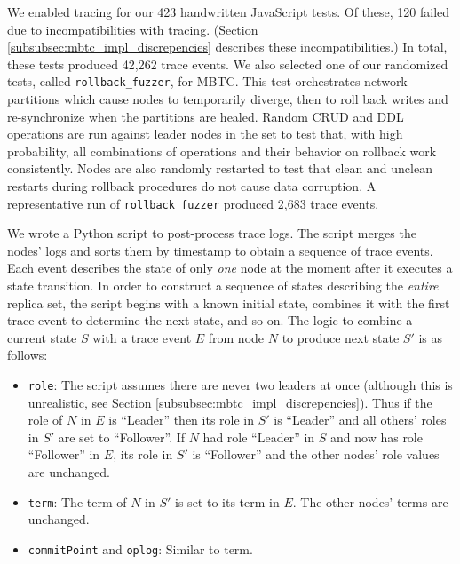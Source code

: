 \documentclass{vldb}
\begin{document}
We enabled tracing for our 423 handwritten JavaScript tests. 
Of these, 120 failed due to incompatibilities with tracing. 
(Section \ref{subsubsec:mbtc_impl_discrepencies} describes these incompatibilities.)
In total, these tests produced 42,262 trace events. 
We also selected one of our randomized tests, called \texttt{rollback\_fuzzer}, for MBTC. 
This test orchestrates network partitions which cause nodes to temporarily diverge, then to roll back writes and re-synchronize when the partitions are healed.
Random CRUD and DDL operations are run against leader nodes in the set to test that, with high probability, all combinations of operations and their behavior on rollback work consistently.
Nodes are also randomly restarted to test that clean and unclean restarts during rollback procedures do not cause data corruption.
A representative run of \texttt{rollback\_fuzzer} produced 2,683 trace events.

We wrote a Python script \cite{ReplTraceChecker} to post-process trace logs. 
The script merges the nodes' logs and sorts them by timestamp to obtain a sequence of trace events. 
Each event describes the state of only \textit{one} node at the moment after it executes a state transition.
In order to construct a sequence of states describing the \textit{entire} replica set, the script begins with a known initial state, combines it with the first trace event to determine the next state, and so on. 
The logic to combine a current state $S$ with a trace event $E$ from node $N$ to produce next state $S'$ is as follows:

\begin{itemize}[itemsep=-0.5ex]
\item \texttt{role}: The script assumes there are never two leaders at once (although this is unrealistic, see Section \ref{subsubsec:mbtc_impl_discrepencies}). Thus if the role of $N$ in $E$ is ``Leader'' then its role in $S'$ is ``Leader'' and all others' roles in $S'$ are set to ``Follower''. If $N$ had role ``Leader'' in $S$ and now has role ``Follower'' in $E$, its role in $S'$ is ``Follower'' and the other nodes' role values are unchanged. 
\item \texttt{term}: The term of $N$ in $S'$ is set to its term in $E$. The other nodes' terms are unchanged.
\item \texttt{commitPoint} and \texttt{oplog}: Similar to term.
\end{itemize}
\end{document}

